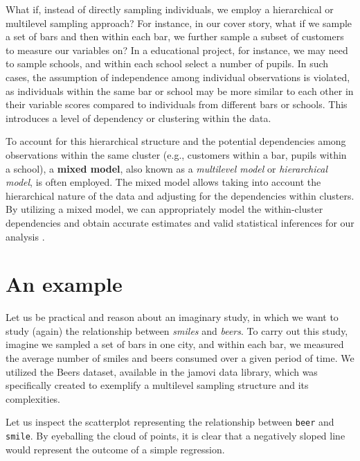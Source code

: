 \documentclass[
]{book}
\begin{document}
What if, instead of directly sampling individuals, we employ a hierarchical or multilevel sampling approach? For instance, in our cover story, what if we sample a set of bars and then within each bar, we further sample a subset of customers to measure our variables on? In a educational project, for instance, we may need to sample schools, and within each school select a number of pupils. In such cases, the assumption of independence among individual observations is violated, as individuals within the same bar or school may be more similar to each other in their variable scores compared to individuals from different bars or schools. This introduces a level of dependency or clustering within the data.

To account for this hierarchical structure and the potential dependencies among observations within the same cluster (e.g., customers within a bar, pupils within a school), a \textbf{mixed model}, also known as a \emph{multilevel model} or \emph{hierarchical model}, is often employed. The mixed model allows taking into account the hierarchical nature of the data and adjusting for the dependencies within clusters. By utilizing a mixed model, we can appropriately model the within-cluster dependencies and obtain accurate estimates and valid statistical inferences for our analysis \citep{verbeke2000linear, stroup2013generalized, mcculloch2001generalized}.

\hypertarget{an-example}{%
\section{An example}\label{an-example}}

Let us be practical and reason about an imaginary study, in which we want to study (again) the relationship between \emph{smiles} and \emph{beers}. To carry out this study, imagine we sampled a set of bars in one city, and within each bar, we measured the average number of smiles and beers consumed over a given period of time. We utilized the Beers dataset, available in the {jamovi} data library, which was specifically created to exemplify a multilevel sampling structure and its complexities.

Let us inspect the scatterplot representing the relationship between \texttt{beer} and \texttt{smile}. By eyeballing the cloud of points, it is clear that a negatively sloped line would represent the outcome of a simple regression.
\end{document}

